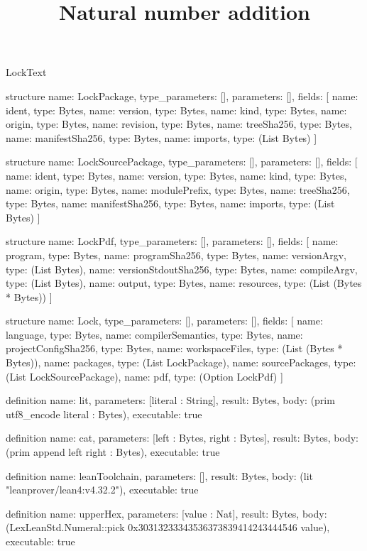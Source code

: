 \begin{lexlean}{LockText}
\title{Natural number addition}
\begin{semanticmodule}
structure{
  name: LockPackage,
  type_parameters: [],
  parameters: [],
  fields: [
    {name: ident, type: Bytes},
    {name: version, type: Bytes},
    {name: kind, type: Bytes},
    {name: origin, type: Bytes},
    {name: revision, type: Bytes},
    {name: treeSha256, type: Bytes},
    {name: manifestSha256, type: Bytes},
    {name: imports, type: (List Bytes)}
  ]
}

structure{
  name: LockSourcePackage,
  type_parameters: [],
  parameters: [],
  fields: [
    {name: ident, type: Bytes},
    {name: version, type: Bytes},
    {name: kind, type: Bytes},
    {name: origin, type: Bytes},
    {name: modulePrefix, type: Bytes},
    {name: treeSha256, type: Bytes},
    {name: manifestSha256, type: Bytes},
    {name: imports, type: (List Bytes)}
  ]
}

structure{
  name: LockPdf,
  type_parameters: [],
  parameters: [],
  fields: [
    {name: program, type: Bytes},
    {name: programSha256, type: Bytes},
    {name: versionArgv, type: (List Bytes)},
    {name: versionStdoutSha256, type: Bytes},
    {name: compileArgv, type: (List Bytes)},
    {name: output, type: Bytes},
    {name: resources, type: (List (Bytes * Bytes))}
  ]
}

structure{
  name: Lock,
  type_parameters: [],
  parameters: [],
  fields: [
    {name: language, type: Bytes},
    {name: compilerSemantics, type: Bytes},
    {name: projectConfigSha256, type: Bytes},
    {name: workspaceFiles, type: (List (Bytes * Bytes))},
    {name: packages, type: (List LockPackage)},
    {name: sourcePackages, type: (List LockSourcePackage)},
    {name: pdf, type: (Option LockPdf)}
  ]
}

definition{
  name: lit,
  parameters: [literal : String],
  result: Bytes,
  body: (prim utf8_encode literal : Bytes),
  executable: true
}

definition{
  name: cat,
  parameters: [left : Bytes, right : Bytes],
  result: Bytes,
  body: (prim append left right : Bytes),
  executable: true
}

definition{
  name: leanToolchain,
  parameters: [],
  result: Bytes,
  body: (lit "leanprover/lean4:v4.32.2"),
  executable: true
}

definition{
  name: upperHex,
  parameters: [value : Nat],
  result: Bytes,
  body: (LexLeanStd.Numeral::pick 0x30313233343536373839414243444546 value),
  executable: true
}


\end{semanticmodule}
\end{lexlean}
